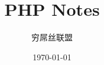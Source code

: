 \documentclass[a4paper,adobefonts,11pt,UTF8]{book}
\title{{\zihao{1}PHP Notes}}
\author{{\zihao{3}穷屌丝联盟}}
\date{\today}
\begin{document}


\maketitle
\tableofcontents
\listoffigures
\listoftables
\listofexamples
\printindex




















\end{document}

